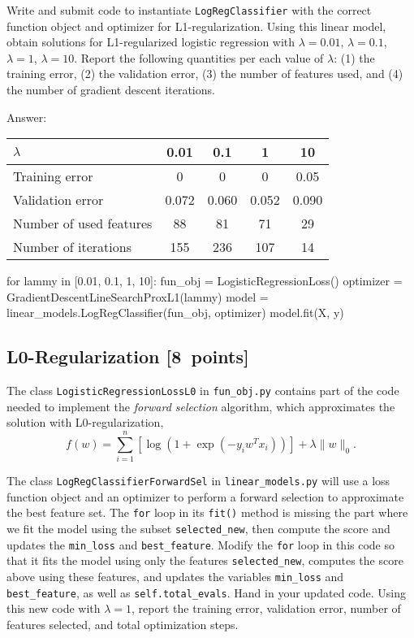\documentclass{article}
\newcommand{\blu}[1]{{\textcolor{blu}{#1}}}
\newenvironment{answer}{\par\begingroup\color{gre}Answer: }{\endgroup}
\let\ask\blu
\newenvironment{asking}{\begingroup\color{blu}}{\endgroup}
\newcommand\pts[1]{\textcolor{pointscolour}{[#1~points]}}
\newcommand{\norm}[1]{\lVert #1 \rVert}
\begin{document}
\begin{asking}Write and submit code to instantiate \verb|LogRegClassifier| with the correct function object and optimizer for L1-regularization. Using this linear model, obtain solutions for L1-regularized logistic regression with $\lambda = 0.01$, $\lambda = 0.1$, $\lambda = 1$, $\lambda = 10$. Report the following quantities per each value of $\lambda$: (1) the training error, (2) the validation error, (3) the number of features used, and (4) the number of gradient descent iterations.\end{asking}
\begin{answer}
\begin{center}
    \begin{tabular}{ |l|c|c|c|c| }
         \hline
         $\lambda$ & 0.01 & 0.1 & 1 & 10\\
         \hline
         Training error & 0 & 0 & 0 & 0.05\\
         Validation error & 0.072 & 0.060 & 0.052 & 0.090\\
         Number of used features & 88 & 81 & 71 & 29\\
         Number of iterations & 155 & 236 & 107 & 14\\
         \hline
    \end{tabular}
\end{center}
\end{answer}
\vspace{1em}
\begin{python}
for lammy in [0.01, 0.1, 1, 10]:
    fun_obj = LogisticRegressionLoss()
    optimizer = GradientDescentLineSearchProxL1(lammy)
    model = linear_models.LogRegClassifier(fun_obj, optimizer)
    model.fit(X, y)
\end{python}


\subsection{L0-Regularization \pts{8}}

The class \verb|LogisticRegressionLossL0| in \verb|fun_obj.py| contains part of the code needed to implement the \emph{forward selection} algorithm,
which approximates the solution with L0-regularization,
\[
f(w) =  \sum_{i=1}^n \left[\log(1+\exp(-y_iw^Tx_i))\right] + \lambda\norm{w}_0.
\]

The class \verb|LogRegClassifierForwardSel| in \verb|linear_models.py| will use a loss function object and an optimizer to perform a forward selection to approximate the best feature set.
The \verb|for| loop in its \verb|fit()| method is missing the part where we fit the model using the subset \verb|selected_new|,
then compute the score and updates the \verb|min_loss| and \verb|best_feature|.
Modify the \verb|for| loop in this code so that it fits the model using only
the features \verb|selected_new|, computes the score above using these features,
and updates the variables \verb|min_loss| and \verb|best_feature|,
as well as \verb|self.total_evals|.
\ask{Hand in your updated code. Using this new code with $\lambda=1$,
report the training error, validation error, number of features selected, and total optimization steps.}
\end{document}
